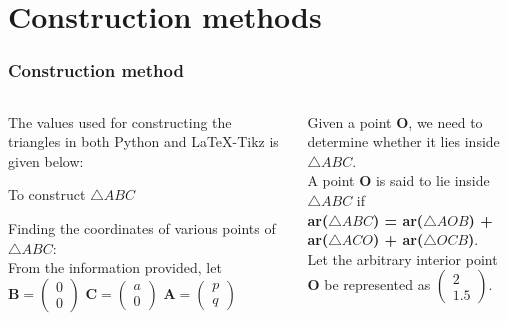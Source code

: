 \documentclass{beamer}
\renewcommand{\vec}[1]{\mathbf{#1}}
\begin{document}
\section*{Construction methods}
\begin{frame}[fragile]
\footnotesize
\frametitle{Construction method}
\begin{columns}
\begin{column}{0.5\textwidth}
The values used for constructing the triangles in both Python and \LaTeX{}-Tikz is given below:
\begin{table}[ht]
    \begin{center}
    	
  \caption{To construct $\triangle ABC$}
   \label{table:table1}
   \end{center}	
\end{table}

Finding the coordinates of various points of  $\triangle ABC$:\\
From the information provided, let\\
    \quad $ \vec{B}= \begin{pmatrix}0\\0\end{pmatrix}$
    \quad $\vec{C}=\begin{pmatrix}a\\0\end{pmatrix}$
    \quad $\vec{A}=\begin{pmatrix}p\\q\end{pmatrix}$
 \end{column}
\begin{column}{0.5\textwidth}   
    Given a point $\vec{O}$, we need to determine whether it lies inside $\triangle ABC$.\\ 
      A point $\vec{O}$ is said to lie inside $\triangle ABC$ if \\
   
      \textbf{ar\big($\triangle ABC$\big) = ar\big($\triangle AOB$\big) + ar\big($\triangle ACO$\big) + ar\big($\triangle OCB$\big)}.\\

  Let the arbitrary interior point $\vec{O}$ be represented as $\begin{pmatrix}2\\1.5\end{pmatrix}$.\quad

 
    
\end{column}
\end{columns}
\end{frame}
\end{document}
